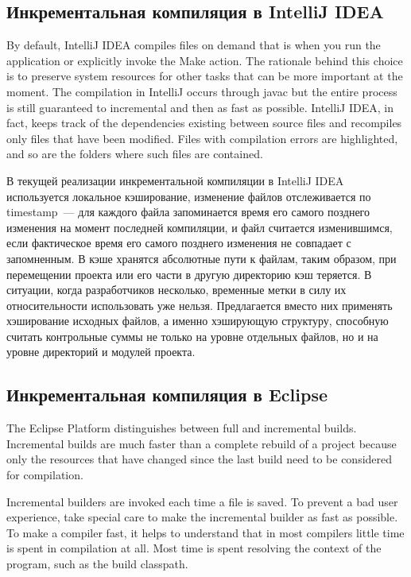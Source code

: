 \subsection{Инкрементальная компиляция в IntelliJ IDEA}
By default, IntelliJ IDEA compiles files on demand that is when you run the application or explicitly invoke the Make action. The rationale behind this choice is to preserve system resources for other tasks that can be more important at the moment.
The compilation in IntelliJ occurs through javac but the entire process is still guaranteed to incremental and then as fast as possible. IntelliJ IDEA, in fact, keeps track of the dependencies existing between source files and recompiles only files that have been modified. Files with compilation errors are highlighted, and so are the folders where such files are contained.

В текущей реализации инкрементальной компиляции в IntelliJ IDEA используется локальное кэширование, изменение файлов отслеживается по timestamp~--- для каждого файла запоминается время его самого позднего изменения на момент последней компиляции, и файл считается изменившимся, если фактическое время его самого позднего изменения не совпадает с запомненным. В кэше хранятся абсолютные пути к файлам, таким образом, при перемещении проекта или его части в другую директорию кэш теряется. В ситуации, когда разработчиков несколько, временные метки в силу их относительности использовать уже нельзя. Предлагается вместо них применять хэширование исходных файлов, а именно хэширующую структуру, способную считать контрольные суммы не только на уровне отдельных файлов, но и на уровне директорий и модулей проекта.

\subsection{Инкрементальная компиляция в Eclipse}
The Eclipse Platform distinguishes between full and incremental builds. Incremental builds are much faster than a complete rebuild of a project because only the resources that have changed since the last build need to be considered for compilation.

Incremental builders are invoked each time a file is saved. To prevent a bad user experience, take special care to make the incremental builder as fast as possible. To make a compiler fast, it helps to understand that in most compilers little time is spent in compilation at all. Most time is spent resolving the context of the program, such as the build classpath.

